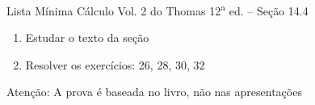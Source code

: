 \begin{frame}{Lista Mínima}
  Cálculo Vol. 2 do Thomas 12\textsuperscript{a} ed. -- Seção 14.4
  \begin{enumerate}
    \item Estudar o texto da seção
    \item Resolver os exercícios: 26, 28, 30, 32
  \end{enumerate}

  \vfill
  Atenção: A prova é baseada no livro, não nas apresentações
\end{frame}


